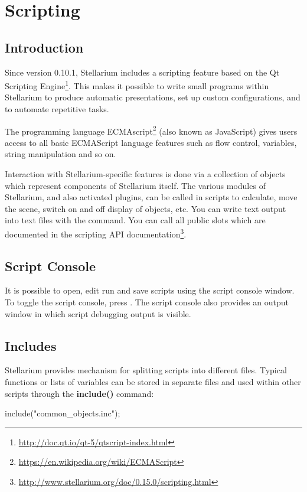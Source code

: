 
\chapter{Scripting}
\label{ch:scripting}

\section{Introduction}
\label{sec:scripting:introduction}

Since version 0.10.1, Stellarium includes a scripting feature based on
the Qt Scripting
Engine\footnote{\url{http://doc.qt.io/qt-5/qtscript-index.html}}. This
makes it possible to write small programs within Stellarium to produce
automatic presentations, set up custom configurations, and to automate
repetitive tasks. 

The programming language
ECMAscript\footnote{\url{https://en.wikipedia.org/wiki/ECMAScript}}
(also known as JavaScript) gives users access to all basic ECMAScript
language features such as flow control, variables, string manipulation
and so on.

Interaction with Stellarium-specific features is done via a collection
of objects which represent components of Stellarium itself.  The
various modules of Stellarium, and also activated plugins, can be
called in scripts to calculate, move the scene, switch on and off
display of objects, etc.  You can write text output into text files
with the  command.  You can call all public slots
which are documented in the scripting API documentation\footnote{\url{http://www.stellarium.org/doc/0.15.0/scripting.html}}.


\section{Script Console}
\label{sec:scripting:console}
It is possible to open, edit run and save scripts using the script
console window. To toggle the script console, press . The
script console also provides an output window in which script
debugging output is visible. 

\section{Includes}
\label{sec:scripting:includes}

Stellarium provides mechanism for splitting scripts into different
files. Typical functions or lists of variables can be stored in
separate  files and used within other scripts through the
\textbf{include()} command:
\begin{script}
include("common_objects.inc");
\end{script}



